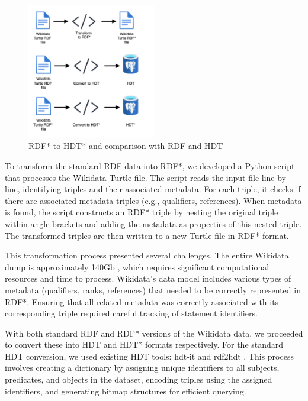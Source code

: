 \begin{figure}[htbp]
    \centering
    \includegraphics[width=0.5\textwidth]{12.png}
    \caption{RDF* to HDT* and comparison with RDF and HDT}
    \label{fig:image12}
\end{figure}

To transform the standard RDF data into RDF*, we developed a Python script that processes the Wikidata Turtle file. The script reads the input file line by line, identifying triples and their associated metadata. For each triple, it checks if there are associated metadata triples (e.g., qualifiers, references). When metadata is found, the script constructs an RDF* triple by nesting the original triple within angle brackets and adding the metadata as properties of this nested triple. The transformed triples are then written to a new Turtle file in RDF* format.

This transformation process presented several challenges. The entire Wikidata dump is approximately 140Gb \citep{wikidata_dumps}, which requires significant computational resources and time to process. Wikidata's data model includes various types of metadata (qualifiers, ranks, references) that needed to be correctly represented in RDF*. Ensuring that all related metadata was correctly associated with its corresponding triple required careful tracking of statement identifiers.

With both standard RDF and RDF* versions of the Wikidata data, we proceeded to convert these into HDT and HDT* formats respectively. For the standard HDT conversion, we used existing HDT tools: hdt-it \citep{hdtit} and rdf2hdt \citep{rdf2hdt}. This process involves creating a dictionary by assigning unique identifiers to all subjects, predicates, and objects in the dataset, encoding triples using the assigned identifiers, and generating bitmap structures for efficient querying.

